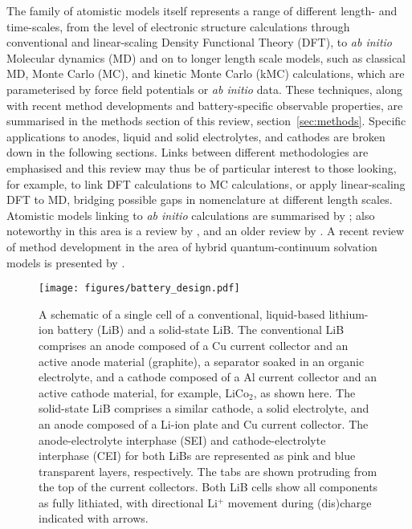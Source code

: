 \documentclass[../main.tex]{subfiles}
\begin{document}
The family of atomistic models itself represents a range of different length- and time-scales, from the level of electronic structure calculations through conventional and linear-scaling Density Functional Theory (DFT), to \textit{ab initio} Molecular dynamics (MD) and on to longer length scale models, such as classical MD, Monte Carlo (MC), and kinetic Monte Carlo (kMC) calculations, which are parameterised by force field potentials or \textit{ab initio} data. These techniques, along with recent method developments and battery-specific observable properties, are summarised in the methods section of this review, section~\ref{sec:methods}. Specific applications to anodes, liquid and solid electrolytes, and cathodes are broken down in the following sections. Links between different methodologies are emphasised and this review may thus be of particular interest to those looking, for example, to link DFT calculations to MC calculations, or apply linear-scaling DFT to MD, bridging possible gaps in nomenclature at different length scales. Atomistic models linking to \textit{ab initio} calculations are summarised by \citeauthor{VanderVen2020} \cite{VanderVen2020}; also noteworthy in this area is a review by \citeauthor{Shi_2016},\cite{Shi_2016} and an older review by \citeauthor{franco2013multiscale}.\cite{franco2013multiscale} A recent review of method development in the area of hybrid quantum-continuum solvation models is presented by \citeauthor{Herbert2021}.\cite{Herbert2021}

\begin{figure}
    \centering
    \texttt{[image: figures/battery\_design.pdf]}
    \caption{A schematic of a single cell of a conventional, liquid-based lithium-ion battery (LiB) and a solid-state LiB. The conventional LiB comprises an anode composed of a Cu current collector and an active anode material (graphite), a separator soaked in an organic electrolyte, and a cathode composed of a Al current collector and an active cathode material, for example, LiCo$_2$, as shown here. The solid-state LiB comprises a similar cathode, a solid electrolyte, and an anode composed of a Li-ion plate and Cu current collector. The anode-electrolyte interphase (SEI) and cathode-electrolyte interphase (CEI) for both LiBs are represented as pink and blue transparent layers, respectively. The tabs are shown protruding from the top of the current collectors. Both LiB cells show all components as fully lithiated, with directional Li$^+$ movement during (dis)charge indicated with arrows.}
    \label{fig:battery_schematic}
\end{figure}
\end{document}
